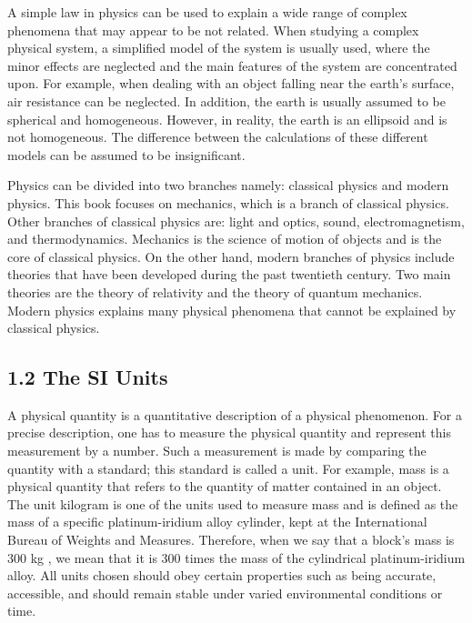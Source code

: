 \documentclass[10pt]{article}
\begin{document}
A simple law in physics can be used to explain a wide range of complex phenomena that may appear to be not related. When studying a complex physical system, a simplified model of the system is usually used, where the minor effects are neglected and the main features of the system are concentrated upon. For example, when dealing with an object falling near the earth's surface, air resistance can be neglected. In addition, the earth is usually assumed to be spherical and homogeneous. However, in reality, the earth is an ellipsoid and is not homogeneous. The difference between the calculations of these different models can be assumed to be insignificant.

Physics can be divided into two branches namely: classical physics and modern physics. This book focuses on mechanics, which is a branch of classical physics. Other branches of classical physics are: light and optics, sound, electromagnetism, and thermodynamics. Mechanics is the science of motion of objects and is the core of classical physics. On the other hand, modern branches of physics include theories that have been developed during the past twentieth century. Two main theories are the theory of relativity and the theory of quantum mechanics. Modern physics explains many physical phenomena that cannot be explained by classical physics.

\subsection*{1.2 The SI Units}
A physical quantity is a quantitative description of a physical phenomenon. For a precise description, one has to measure the physical quantity and represent this measurement by a number. Such a measurement is made by comparing the quantity with a standard; this standard is called a unit. For example, mass is a physical quantity that refers to the quantity of matter contained in an object. The unit kilogram is one of the units used to measure mass and is defined as the mass of a specific platinum-iridium alloy cylinder, kept at the International Bureau of Weights and Measures. Therefore, when we say that a block's mass is 300 kg , we mean that it is 300 times the mass of the cylindrical platinum-iridium alloy. All units chosen should obey certain properties such as being accurate, accessible, and should remain stable under varied environmental conditions or time.
\end{document}
